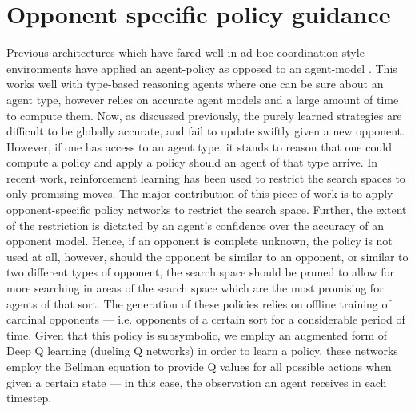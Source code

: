 \section{Opponent specific policy guidance}
Previous architectures which have fared well in ad-hoc coordination style environments have applied an agent-policy as opposed to an agent-model \cite{Barrett2015}. This works well with type-based reasoning agents where one can be sure about an agent type, however relies on accurate agent models and a large amount of time to compute them.
\newline \newline
Now, as discussed previously, the purely learned strategies are difficult to be globally accurate, and fail to update swiftly given a new opponent. However, if one has access to an agent type, it stands to reason that one could compute a policy and apply a policy should an agent of that type arrive.
\newline \newline
In recent work, reinforcement learning has been used to restrict the search spaces to only promising moves. The major contribution of this piece of work is to apply opponent-specific policy networks to restrict the search space. Further, the extent of the restriction is dictated by an agent's confidence over the accuracy of an opponent model. Hence, if an opponent is complete unknown, the policy is not used at all, however, should the opponent be similar to an opponent, or similar to two different types of opponent, the search space should be pruned to allow for more searching in areas of the search space which are the most promising for agents of that sort. 
\newline \newline
The generation of these policies relies on offline training of cardinal opponents --- i.e. opponents of a certain sort for a considerable period of time. Given that this policy is subsymbolic, we employ an augmented form of Deep Q learning (dueling Q networks) in order to learn a policy. these networks employ the Bellman equation to provide Q values for all possible actions when given a certain state --- in this case, the observation an agent receives in each timestep.

